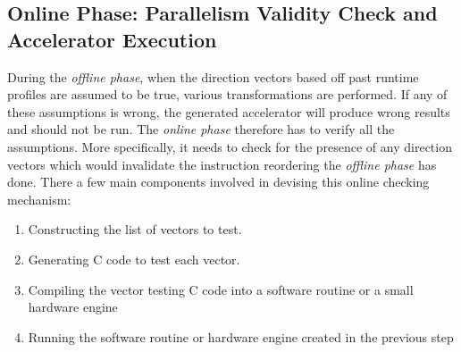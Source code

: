 \subsection{Online Phase: Parallelism Validity Check and Accelerator Execution}
\label{onlinephase}

During the \textit{offline phase}, when the direction vectors based off past runtime profiles are assumed to be true, various transformations are performed. If any of these
assumptions is wrong, the generated accelerator will produce wrong results and should not be run. The \textit{online phase} therefore has to verify all the assumptions. More specifically, it needs to check for the presence of any direction vectors which would
invalidate the instruction reordering the \textit{offline phase} has done. 
There a few main components involved in devising this online checking mechanism:
\begin{enumerate}
    \item Constructing the list of vectors to test.  
    \item Generating C code to test each vector. 
    \item Compiling the vector testing C code into a software routine or a small hardware engine
    \item Running the software routine or hardware engine created in the previous step
\end{enumerate}

